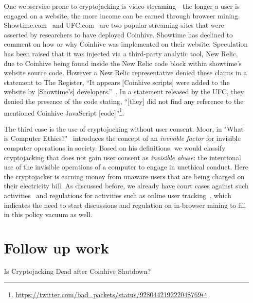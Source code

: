 One webservice prone to cryptojacking is video streaming---the longer a user is engaged on a website, the more income can be earned through browser mining. Showtime.com~\cite{registershowtime} and UFC.com~\cite{registerufcmonero} are two popular streaming sites that were asserted by researchers to have deployed Coinhive. Showtime has declined to comment on how or why Coinhive was implemented on their website. Speculation has been raised that it was injected via a third-party analytic tool, New Relic, due to Coinhive being found inside the New Relic code block within showtime's website source code. However a New Relic representative denied these claims in a statement to The Register, ``It appears [Coinhive scripts] were added to the website by [Showtime's] developers.''~\cite{registershowtime}. In a statement released by the UFC, they denied the presence of the code stating, ``[they] did not find any reference to the mentioned Coinhive JavaScript [code]''\footnote{\url{https://twitter.com/bad_packets/status/928044219222048769}}.

The third case is the use of cryptojacking without user consent. Moor, in "What is Computer Ethics?"~\cite{moor1985computer} introduces the concept of an \textit{invisible factor} for invisible computer operations in society. Based on his definitions, we would classify cryptojacking that does not gain user consent as \textit{invisible abuse}: the intentional use of the invisible operations of a computer to engage in unethical conduct. Here the cryptojacker is earning money from unaware users that are being charged on their electricity bill. As discussed before, we already have court cases against such activities~\cite{njcourtbitcoinjsminer} and regulations for activities such as online user tracking~\cite{eucookie}, which indicates the need to start discussions and regulation on in-browser mining to fill in this policy vacuum as well. 




\section{Follow up work}\label{sec:cryptojackingfollowup}



Is Cryptojacking Dead after Coinhive Shutdown?~\cite{varlioglu2020cryptojacking}





